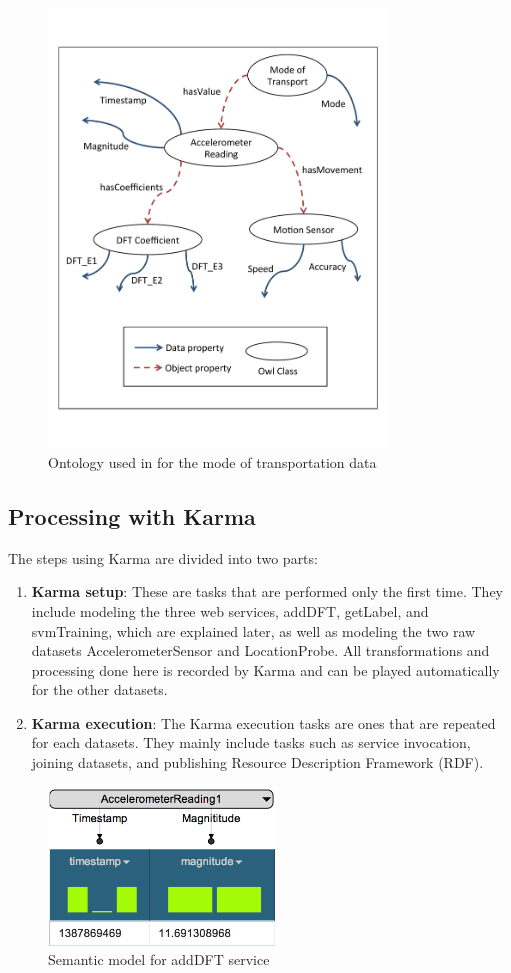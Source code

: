 \begin{figure}[h]
\centering
\includegraphics[width=90mm]{img/ontology.pdf}
\caption{Ontology used in for the mode of transportation data\label{fig:ontology}}
\end{figure}


\subsection{Processing with Karma}
The steps using Karma are divided into two parts:
\begin{enumerate}
  \item \textbf{Karma setup}: These are tasks that are performed only the first time. They include modeling the three web services, addDFT, getLabel, and svmTraining, which are explained later, as well as modeling the two raw datasets AccelerometerSensor and LocationProbe. All transformations and processing done here is recorded by Karma and can be played automatically for the other datasets. 
  \item \textbf{Karma execution}: The Karma execution tasks are ones that are repeated for each datasets. They mainly include tasks such as service invocation, joining datasets, and publishing Resource Description Framework (RDF).
\end{enumerate} 

\begin{figure}[h]
\centering
\includegraphics[width=60mm]{img/DFTservice}
\caption{Semantic model for addDFT service\label{fig:dftService}}
\end{figure}

